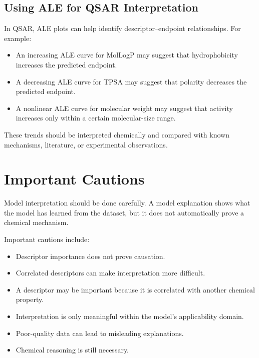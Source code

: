 \documentclass[11pt]{report}
\newenvironment{Important note}{\begin{quote}\color{red}\textbf{Important note:} }{\end{quote}}
\begin{document}
\subsection{Using ALE for QSAR Interpretation}

In QSAR, ALE plots can help identify descriptor--endpoint relationships. For example:

\begin{itemize}[leftmargin=*]
    \item An increasing ALE curve for MolLogP may suggest that hydrophobicity increases the predicted endpoint.
    \item A decreasing ALE curve for TPSA may suggest that polarity decreases the predicted endpoint.
    \item A nonlinear ALE curve for molecular weight may suggest that activity increases only within a certain molecular-size range.
\end{itemize}

These trends should be interpreted chemically and compared with known mechanisms, literature, or experimental observations.



\section{Important Cautions}

Model interpretation should be done carefully. A model explanation shows what the model has learned from the dataset, but it does not automatically prove a chemical mechanism.

Important cautions include:

\begin{itemize}[leftmargin=*]
    \item Descriptor importance does not prove causation.
    \item Correlated descriptors can make interpretation more difficult.
    \item A descriptor may be important because it is correlated with another chemical property.
    \item Interpretation is only meaningful within the model's applicability domain.
    \item Poor-quality data can lead to misleading explanations.
    \item Chemical reasoning is still necessary.
\end{itemize}
\end{document}
